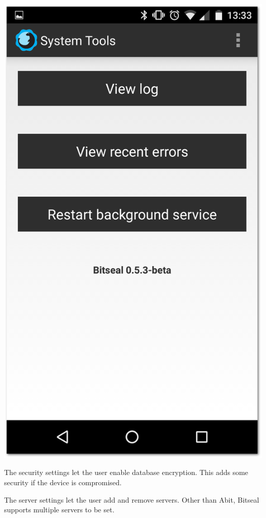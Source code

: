 \documentclass{bfh}
\begin{document}
\begin{center}
\begin{minipage}{.3\linewidth}
      \includegraphics[width=1.0 \textwidth]{images/screenshots/bitseal_settings_system_tools.png}
    \end{minipage}
  \end{center}

  The security settings let the user enable database encryption. This adds some security if the device is compromised.

  The server settings let the user add and remove servers. Other than Abit, Bitseal supports multiple servers to be set.
\end{document}
